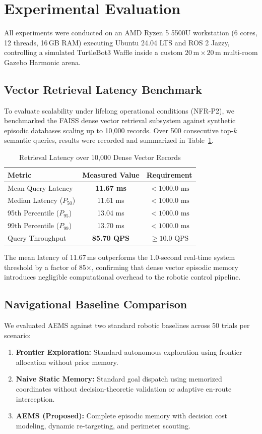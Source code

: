 \documentclass[conference]{IEEEtran}
\begin{document}
\section{Experimental Evaluation}

All experiments were conducted on an AMD Ryzen 5 5500U workstation (6 cores, 12 threads, 16\,GB RAM) executing Ubuntu 24.04 LTS and ROS 2 Jazzy, controlling a simulated TurtleBot3 Waffle inside a custom $20\,\text{m} \times 20\,\text{m}$ multi-room Gazebo Harmonic arena.

\subsection{Vector Retrieval Latency Benchmark}
To evaluate scalability under lifelong operational conditions (NFR-P2), we benchmarked the FAISS dense vector retrieval subsystem against synthetic episodic databases scaling up to 10,000 records. Over 500 consecutive top-$k$ semantic queries, results were recorded and summarized in Table~\ref{tab:retrieval}.

\begin{table}[h]
\centering
\caption{Retrieval Latency over 10,000 Dense Vector Records}
\label{tab:retrieval}
\begin{tabular}{lcc}
\toprule
\textbf{Metric} & \textbf{Measured Value} & \textbf{Requirement} \\
\midrule
Mean Query Latency & \textbf{11.67 ms} & $< 1000.0\text{ ms}$ \\
Median Latency ($P_{50}$) & 11.61 ms & $< 1000.0\text{ ms}$ \\
95th Percentile ($P_{95}$) & 13.04 ms & $< 1000.0\text{ ms}$ \\
99th Percentile ($P_{99}$) & 13.70 ms & $< 1000.0\text{ ms}$ \\
Query Throughput & \textbf{85.70 QPS} & $\ge 10.0\text{ QPS}$ \\
\bottomrule
\end{tabular}
\end{table}

The mean latency of 11.67\,ms outperforms the 1.0-second real-time system threshold by a factor of 85$\times$, confirming that dense vector episodic memory introduces negligible computational overhead to the robotic control pipeline.

\subsection{Navigational Baseline Comparison}
We evaluated AEMS against two standard robotic baselines across 50 trials per scenario:
\begin{enumerate}
    \item \textbf{Frontier Exploration:} Standard autonomous exploration using frontier allocation without prior memory.
    \item \textbf{Naive Static Memory:} Standard goal dispatch using memorized coordinates without decision-theoretic validation or adaptive en-route interception.
    \item \textbf{AEMS (Proposed):} Complete episodic memory with decision cost modeling, dynamic re-targeting, and perimeter scouting.
\end{enumerate}
\end{document}
